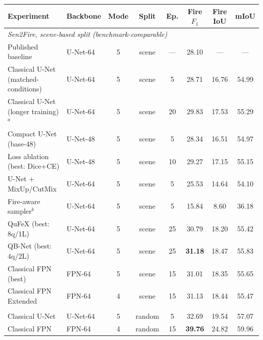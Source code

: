 \documentclass{article}
\begin{document}
\begin{table}[H]
    \centering
    \small
    \setlength{\tabcolsep}{4pt}
    \begin{tabular}{llcccccc}
        \toprule
        Experiment & Backbone & Mode & Split & Ep. & Fire $F_1$ & Fire IoU & mIoU \\
        \midrule
        \multicolumn{8}{l}{\emph{Sen2Fire, scene-based split (benchmark-comparable)}}\\
        Published baseline~\cite{sen2fire}        & U-Net-64 & 5 & scene & ---  & 28.10 & ---   & ---   \\
        Classical U-Net (matched-conditions)      & U-Net-64 & 5 & scene & 5    & 28.71 & 16.76 & 54.99 \\
        Classical U-Net (longer training)$^{a}$   & U-Net-64 & 5 & scene & 20   & 29.83 & 17.53 & 55.29 \\
        Compact U-Net (base-48)                   & U-Net-48 & 5 & scene & 5    & 28.34 & 16.51 & 54.97 \\
        Loss ablation (best: Dice+CE)             & U-Net-48 & 5 & scene & 10   & 29.27 & 17.15 & 55.15 \\
        U-Net + MixUp/CutMix                      & U-Net-64 & 5 & scene & 5    & 25.53 & 14.64 & 54.10 \\
        Fire-aware sampler$^{b}$                  & U-Net-64 & 5 & scene & 5    & 15.84 &  8.60 & 36.18 \\
        QuFeX (best: 8q/1L)                       & U-Net-64 & 5 & scene & 25   & 30.79 & 18.20 & 55.42 \\
        QB-Net (best: 4q/2L)                      & U-Net-64 & 5 & scene & 25   & \textbf{31.18} & 18.47 & 55.83 \\
        Classical FPN (best)                      & FPN-64   & 5 & scene & 15   & 31.01 & 18.35 & 55.65 \\
        Classical FPN Extended                    & FPN-64   & 4 & scene & 15   & 31.13 & 18.44 & 55.47 \\
        \addlinespace
        \multicolumn{8}{l}{\emph{Sen2Fire, random $70/15/15$ split (not benchmark-comparable)}}\\
        Classical U-Net                           & U-Net-64 & 5 & random & 5   & 32.69 & 19.54 & 57.07 \\
        Classical FPN                             & FPN-64   & 4 & random & 15  & \textbf{39.76} & 24.82 & 59.96 \\


\end{tabular}
\end{table}
\end{document}
